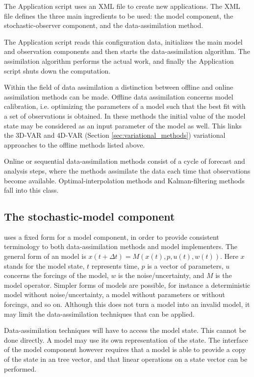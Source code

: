 The \oda Application script uses an XML file to create new \oda applications. The XML file defines the three main ingredients to be used: the \oda model component, the stochastic-observer component, and the data-assimilation method.

The \oda Application script reads this configuration data, initializes the main model and observation components and then starts the data-assimilation algorithm. The assimilation algorithm performs the actual work, and finally the Application script shuts down the computation.

Within the field of data assimilation a distinction between offline and online assimilation methods can be made. Offline data assimilation concerns model calibration, i.e. optimizing the parameters of a model such that the best fit with a set of observations is obtained. In these methods the initial value of the model state may be considered as an input parameter of the model as well. This links the 3D-VAR and 4D-VAR (Section \ref{sec:variational_methods}) variational approaches to the offline methods listed above.

Online or sequential data-assimilation methods consist of a cycle of forecast and analysis steps, where the methods assimilate the data each time that observations become available. Optimal-interpolation methods and Kalman-filtering methods fall into this class.

\subsection{The \oda stochastic-model component}

\oda uses a fixed form for a model component, in order to provide consistent terminology to both data-assimilation methods and model implementers. The general form of an \oda model is
$x(t+\Delta t) = M(x(t), p, u(t), w(t))$.
Here $x$ stands for the model state, $t$ represents time, $p$ is a vector of parameters, $u$ concerns the forcings of the model, $w$ is the noise/uncertainty, and $M$ is the model operator. Simpler forms of models are possible, for instance a deterministic model without noise/uncertainty, a model without parameters or without forcings, and so on. Although this does not turn a model into an invalid \oda model, it may limit the data-assimilation techniques that can be applied.

Data-assimilation techniques will have to access the model state. This cannot be done directly. A model may use its own representation of the state. The interface of the \oda model component however requires that a model is able to provide a copy of the state in an \oda tree vector, and that linear operations on a state vector can be performed.

